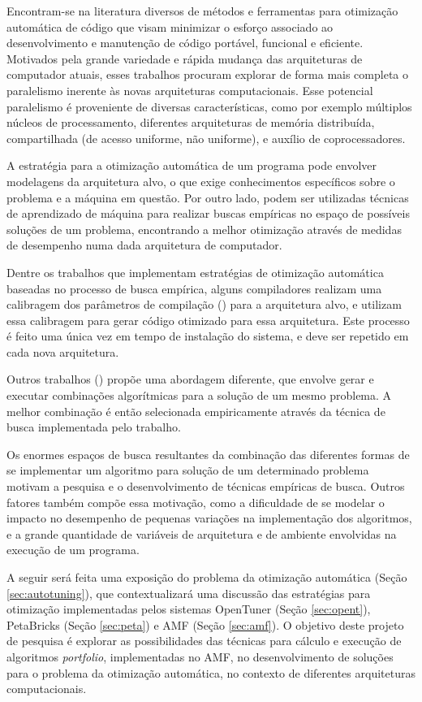\documentclass[a4paper, 11pt]{article}
\begin{document}
Encontram-se na literatura diversos de métodos e ferramentas para otimização 
automática de código que visam minimizar o esforço associado ao desenvolvimento
e manutenção de código portável, funcional e eficiente. Motivados pela grande
variedade e rápida mudança das arquiteturas de computador atuais, esses 
trabalhos procuram explorar de forma mais completa o paralelismo inerente às
novas arquiteturas computacionais. Esse potencial paralelismo é proveniente de
diversas características, como por exemplo múltiplos núcleos de processamento, 
diferentes arquiteturas de memória distribuída, compartilhada (de acesso 
uniforme, não uniforme), e auxílio de coprocessadores.

A estratégia para a otimização automática de um programa pode envolver 
modelagens da arquitetura alvo, o que exige conhecimentos específicos sobre o 
problema e a máquina em questão. Por outro lado, podem ser utilizadas técnicas
de aprendizado de máquina para realizar buscas empíricas no espaço de possíveis
soluções de um problema, encontrando a melhor otimização através de medidas de 
desempenho numa dada arquitetura de computador.

Dentre os trabalhos que implementam estratégias de otimização automática 
baseadas no processo de busca empírica, alguns compiladores realizam uma 
calibragem dos parâmetros de compilação (\citet{bilmes1997,whaley1998}) para a
arquitetura alvo, e utilizam essa calibragem para gerar código otimizado para
essa arquitetura. Este processo é feito uma única vez em tempo de instalação
do sistema, e deve ser repetido em cada nova arquitetura.

Outros trabalhos (\citet{goldman2012framework,mitcsail-tr:2014,
vuduc2004}) propõe uma abordagem diferente, que envolve gerar e executar
combinações algorítmicas para a solução de um mesmo problema. A melhor
combinação é então selecionada empiricamente através da técnica de busca
implementada pelo trabalho.

Os enormes espaços de busca resultantes da combinação das diferentes formas de
se implementar um algoritmo para solução de um determinado problema motivam
a pesquisa e o desenvolvimento de técnicas empíricas de busca. Outros fatores 
também compõe essa motivação, como a dificuldade de se modelar o impacto no 
desempenho de pequenas variações na implementação dos algoritmos, e a grande 
quantidade de variáveis de arquitetura e de ambiente envolvidas na execução de 
um programa.

A seguir será feita uma exposição do problema da otimização automática 
(Seção \ref{sec:autotuning}), que contextualizará uma discussão das 
estratégias para otimização implementadas pelos sistemas 
OpenTuner (Seção \ref{sec:opent}), PetaBricks (Seção \ref{sec:peta}) e AMF
(Seção \ref{sec:amf}). O objetivo deste projeto de pesquisa é explorar as 
possibilidades das técnicas para cálculo e execução de algoritmos
\emph{portfolio}, implementadas no AMF, no desenvolvimento de soluções para o
problema da otimização automática, no contexto de diferentes arquiteturas 
computacionais.
\end{document}
